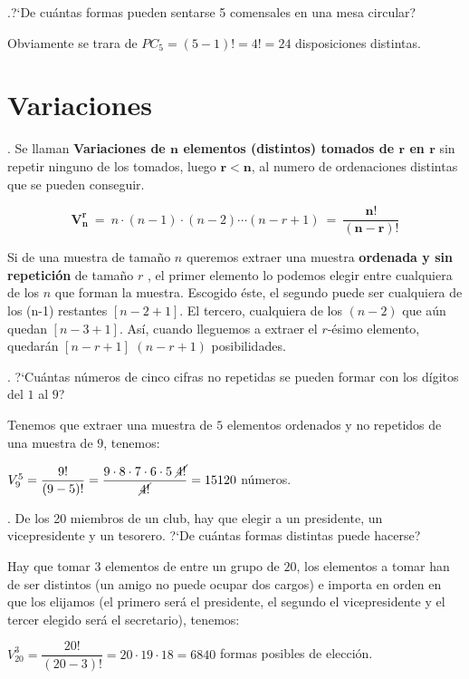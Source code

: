 \begin{example}
	.?`De cuántas formas pueden sentarse 5 comensales en una mesa circular?	
	
	\vspace{4mm} Obviamente se trara de $PC_5=(5-1)!=4!=24$ disposiciones distintas.
\end{example}



\section{Variaciones}

\begin{definition}
	. Se llaman \textbf{Variaciones de $\boldsymbol{n}$ elementos (distintos) tomados de $\boldsymbol{r}$ en $\boldsymbol{r}$} sin repetir ninguno de los tomados, luego $\boldsymbol{r<n}$, al numero de ordenaciones distintas que se pueden conseguir.
	
	 $$ \boxed{ \ \boldsymbol{ V_n^r} \ =\ n\cdot (n-1) \cdot (n-2) \cdots (n-r+1) \ =\ \boldsymbol{ \dfrac {n!}{(n-r)!}  } \ } $$
\end{definition}

\begin{small} 
Si de una muestra de tamaño $n$ queremos extraer una muestra \textbf{ordenada y sin repetición} de tamaño $r$	, el primer elemento lo podemos elegir entre cualquiera de los $n$ que forman la muestra. Escogido éste, el segundo puede ser cualquiera de los (n-1) restantes \textcolor{gris}{$[n-2+1]$}. El tercero, cualquiera de los $(n-2)$ que aún quedan \textcolor{gris}{$[n-3+1]$}. Así, cuando lleguemos a extraer el $r$-ésimo elemento, quedarán \textcolor{gris}{$[n-r+1]$} $(n-r+1)$ posibilidades. 
\end{small}

\begin{example}
	. ?`Cuántas números de cinco cifras no repetidas se pueden formar con los dígitos del $1$ al $9$?
	
	\vspace{4mm} Tenemos que extraer una muestra de $5$ elementos ordenados y no repetidos de una muestra de $9$, tenemos:
	
	\vspace{2mm} $V_9^5=\dfrac{9!}{(9-5)!}=\dfrac{ 9\cdot 8\cdot 	7\cdot 6\cdot 5 \ \cancel{4!} } { \cancel{4!} }=15120$ números.
\end{example}

\begin{example}
	. De los 20 miembros de un club, hay que elegir a un presidente, un vicepresidente y un tesorero. ?`De cuántas formas distintas puede hacerse?
	
	\vspace{4mm} Hay que tomar $3$ elementos de entre un grupo de $20$, los elementos a tomar han de ser distintos (un amigo no puede ocupar dos cargos) e importa en orden en que los elijamos (el primero será el presidente, el segundo el vicepresidente y el tercer elegido será el secretario), tenemos:
	
	\vspace{2mm} $ V_{20}^3=\dfrac{20!}{(20-3)!}=20\cdot 19\cdot 18=6840$ formas posibles de elección.
\end{example}

